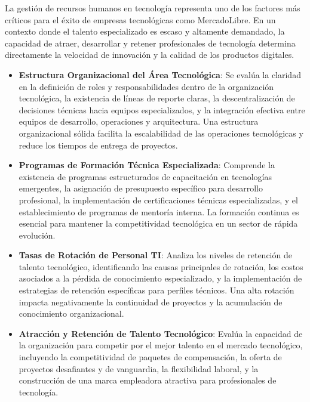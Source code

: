La gestión de recursos humanos en tecnología representa uno de los factores más críticos para el éxito de empresas tecnológicas como MercadoLibre. En un contexto donde el talento especializado es escaso y altamente demandado, la capacidad de atraer, desarrollar y retener profesionales de tecnología determina directamente la velocidad de innovación y la calidad de los productos digitales.

\begin{itemize}
\item \textbf{Estructura Organizacional del Área Tecnológica}: Se evalúa la claridad en la definición de roles y responsabilidades dentro de la organización tecnológica, la existencia de líneas de reporte claras, la descentralización de decisiones técnicas hacia equipos especializados, y la integración efectiva entre equipos de desarrollo, operaciones y arquitectura. Una estructura organizacional sólida facilita la escalabilidad de las operaciones tecnológicas y reduce los tiempos de entrega de proyectos.

\item \textbf{Programas de Formación Técnica Especializada}: Comprende la existencia de programas estructurados de capacitación en tecnologías emergentes, la asignación de presupuesto específico para desarrollo profesional, la implementación de certificaciones técnicas especializadas, y el establecimiento de programas de mentoría interna. La formación continua es esencial para mantener la competitividad tecnológica en un sector de rápida evolución.

\item \textbf{Tasas de Rotación de Personal TI}: Analiza los niveles de retención de talento tecnológico, identificando las causas principales de rotación, los costos asociados a la pérdida de conocimiento especializado, y la implementación de estrategias de retención específicas para perfiles técnicos. Una alta rotación impacta negativamente la continuidad de proyectos y la acumulación de conocimiento organizacional.

\item \textbf{Atracción y Retención de Talento Tecnológico}: Evalúa la capacidad de la organización para competir por el mejor talento en el mercado tecnológico, incluyendo la competitividad de paquetes de compensación, la oferta de proyectos desafiantes y de vanguardia, la flexibilidad laboral, y la construcción de una marca empleadora atractiva para profesionales de tecnología.
\end{itemize}

